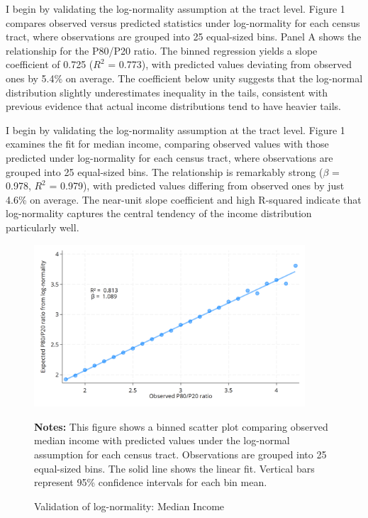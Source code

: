 I begin by validating the log-normality assumption at the tract level. Figure 1 compares observed versus predicted statistics under log-normality for each census tract, where observations are grouped into 25 equal-sized bins. Panel A shows the relationship for the P80/P20 ratio. The binned regression yields a slope coefficient of 0.725 ($R^2$ = 0.773), with predicted values deviating from observed ones by 5.4\% on average. The coefficient below unity suggests that the log-normal distribution slightly underestimates inequality in the tails, consistent with previous evidence that actual income distributions tend to have heavier tails.

I begin by validating the log-normality assumption at the tract level. Figure 1 examines the fit for median income, comparing observed values with those predicted under log-normality for each census tract, where observations are grouped into 25 equal-sized bins. The relationship is remarkably strong ($\beta$ = 0.978, $R^2$ = 0.979), with predicted values differing from observed ones by just 4.6\% on average. The near-unit slope coefficient and high R-squared indicate that log-normality captures the central tendency of the income distribution particularly well.

\begin{figure}[H]
\begin{center}
\captionsetup{justification=centering}
\caption{Validation of log-normality: Median Income}
\label{fig:median}
\includegraphics[width=0.9\textwidth]{output/binned_scatter_median.png}
\end{center}
\begin{fignotes}
\textbf{Notes:} This figure shows a binned scatter plot comparing observed median income with predicted values under the log-normal assumption for each census tract. Observations are grouped into 25 equal-sized bins. The solid line shows the linear fit. Vertical bars represent 95\% confidence intervals for each bin mean.
\end{fignotes}
\end{figure}

